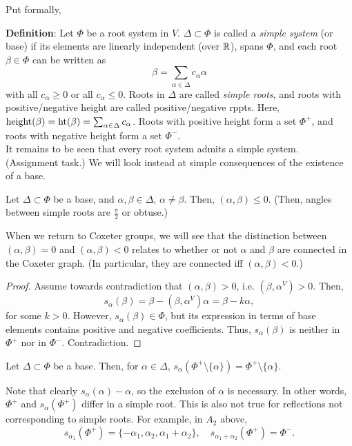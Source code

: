 Put formally,

{\bf Definition}:
Let $\Phi$ be a root system in $V$. $\Delta \subset \Phi$ is called a {\em
simple system} (or base) if its elements are linearly independent (over $\mathbb{R}$),
spans $\Phi$, and each root $\beta \in \Phi$ can be written as
\[
    \beta = \sum_{\alpha \in \Delta} c_\alpha \alpha
\]
with all $c_\alpha \geq 0$ or all $c_\alpha \leq 0$. Roots in $\Delta$ are
called {\em simple roots}, and roots with positive/negative height are called
positive/negative rppts. Here,
${\rm height}(\beta)= {\rm ht}(\beta) = \sum_{\alpha \in \Delta} c_\alpha$.
Roots with positive height form a set $\Phi^+$, and roots with negative height
form a set $\Phi^-$.
\\

It remains to be seen that every root system admits a simple system. (Assignment
task.) We will look instead at simple consequences of the existence of a base.

\begin{lemma} \label{7.1}
Let $\Delta \subset \Phi$ be a base, and $\alpha, \beta \in \Delta$, $\alpha
\neq \beta$. Then, $(\alpha, \beta) \leq 0$. (Then, angles between simple roots
are $\frac{\pi}{2}$ or obtuse.)
\end{lemma}

When we return to Coxeter groups, we will see that the distinction between
$(\alpha, \beta) = 0$ and $(\alpha, \beta) < 0$ relates to whether or not
$\alpha$ and $\beta$ are connected in the Coxeter graph. (In particular, they
are connected iff $(\alpha, \beta) < 0$.)

\begin{proof}
Assume towards contradiction that $(\alpha, \beta) > 0$, i.e.
$(\beta, \alpha^V) > 0$. Then,
\[
    s_\alpha(\beta) = \beta - (\beta, \alpha^V) \alpha = \beta - k\alpha,
\]
for some $k > 0$. However, $s_\alpha(\beta) \in \Phi$, but its expression in
terms of base elements contains positive and negative coefficients. Thus,
$s_\alpha(\beta)$ is neither in $\Phi^+$ nor in $\Phi^-$. Contradiction.
\end{proof}

\begin{lemma} \label{7.2} %
Let $\Delta \subset \Phi$ be a base. Then, for $\alpha \in \Delta$,
$s_\alpha(\Phi^+ \setminus \{\alpha\}) = \Phi^+ \setminus \{\alpha\}$.
\end{lemma}

Note that clearly $s_\alpha(\alpha) - \alpha$, so the exclusion of $\alpha$ is
necessary. In other words, $\Phi^+$ and $s_\alpha(\Phi^+)$ differ in a simple
root. This is also not true for reflections not corresponding to simple roots.
For example, in $A_2$ above,
\[
    s_{\alpha_1}(\Phi^+) = \{-\alpha_1, \alpha_2, \alpha_1 + \alpha_2\},
    \quad
    s_{\alpha_1 + \alpha_2}(\Phi^+) = \Phi^-.
\]

